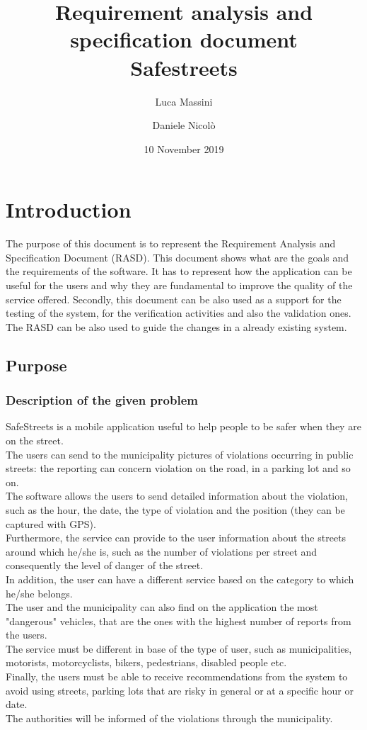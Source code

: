 \documentclass[titlepage]{article}
\author{Luca Massini \and Daniele Nicolò}
\title{Requirement analysis and specification document
\\  Safestreets}
\date{10 November 2019}
\begin{document}
\maketitle
\newpage 
\tableofcontents
\newpage

\section{Introduction}
The purpose of this document is to represent the Requirement Analysis and Specification Document (RASD).
This document shows what are the goals and the requirements of the software.
It has to represent how the application can be useful for the users and why they are fundamental to improve the quality of the service offered. Secondly, this document can be also used as a support for the testing of the system, for the verification activities and also the validation ones. The RASD can be also used to guide the changes in a already existing system.



\subsection{Purpose}

\subsubsection{Description of the given problem}
SafeStreets is a mobile application useful to help people to be safer when they are on the street.\\
The users can send to the municipality pictures of violations occurring in public streets: the reporting can concern violation on the road, in a parking lot and so on.\\
The software allows the users to send detailed information about the violation, such as the hour, the date, the type of violation and the position (they can be captured with GPS).\\
Furthermore, the service can provide to the user information about the streets around which he/she is,
such as the number of violations per street and consequently the level of danger of the street.\\
In addition, the user can have a different service based on the category to which he/she belongs.\\
The user and the municipality can also find on the application the most "dangerous" vehicles, that are the ones with the highest number of reports from the users.\\
The service must be different in base of the type of user, such as municipalities, motorists, motorcyclists, bikers, pedestrians, disabled people etc.\\
Finally, the users must be able to receive recommendations from the system to avoid using streets, parking lots that are risky in general or at a specific hour or date.\\
The authorities will be informed of the violations through the municipality.
\end{document}
